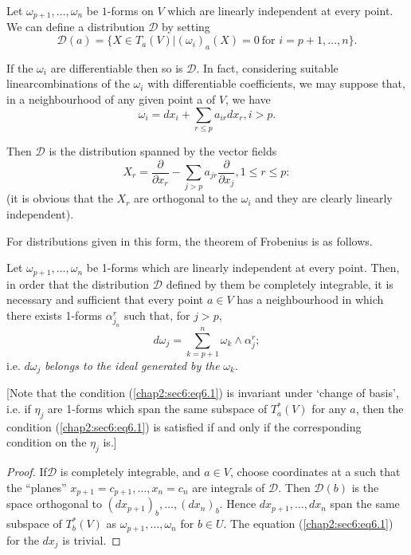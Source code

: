 Let $\omega_{p+1}, \ldots, \omega_n$ be $1$-forms on $V$ which are
linearly independent at every point. We can define a distribution
$\mathscr{D}$ by setting 
$$
\mathscr{D}(a) = \{ X \in T_a (V) \bigg| (\omega_i)_a (X) = 0 ~\text{
  for }i = p + 1, \ldots, n \}. 
$$

If the $\omega_i$ are differentiable then so is $\mathscr{D}$. In
fact, considering suitable linear\pageoriginale combinations of the $\omega_i$ with
differentiable coefficients, we may suppose that, in a neighbourhood
of any given point a of $V$, we have 
$$
\omega_i = dx_i + \sum_{r \leq p}a_{ir} dx_r, i > p.
$$

Then $\mathscr{D}$ is the distribution spanned by the vector fields 
$$
X_r = \frac{\partial}{\partial x_r}- \sum_{j > p} a_{jr}
\frac{\partial}{\partial x_j}, 1 \leq r \leq p: 
$$
(it is obvious that the $X_r$ are orthogonal to the $\omega_i$ and
they are clearly linearly independent).   

For distributions given in this form, the theorem of Frobenius is as follows.

\begin{theorem}\label{chap2:sec6:thm2} %
  Let $ \omega_{p+1}, \ldots , \omega_n$ be 1-forms which are linearly
  independent at every point. Then, in order that the distribution
  $\mathscr{D}$ defined by them be completely integrable, it is
  necessary and sufficient that every point $a \in V$ has a
  neighbourhood in which there exists 1-forms $\alpha^r_{j_n}$ such
  that, for $j > p$, 
  \begin{equation*}
    d \omega_j = \sum^n_{k=p+1} \omega_k \wedge \alpha^r_j;
    \tag{6.1}\label{chap2:sec6:eq6.1} 
  \end{equation*}
  i.e. $d \omega_j$ {\em belongs to the ideal generated by the} $\omega_k$.
\end{theorem}

[Note that the condition (\ref{chap2:sec6:eq6.1}) is invariant under
  `change of basis', 
  i.e. if $\eta_j$ are 1-forms which span the same subspace of
  $T^*_a (V)$ for any $a$, then the condition (\ref{chap2:sec6:eq6.1})
  is satisfied if 
  and only if the corresponding condition on the $\eta_j$ is.]
 
\begin{proof}
  If\pageoriginale $\mathscr{D}$ is completely integrable, and $a \in V$, choose
  coordinates at a such that the ``planes'' $x_{p+1} = c_{p+1}, \ldots,
  x_n = c_n$ are integrals of $\mathscr{D}$. Then $\mathscr{D}(b)$ is
  the space orthogonal to $(dx_{p+1})_b, \ldots, (dx_n)_b$. Hence
  $dx_{p+1}, \ldots, dx_n$ span the same subspace of $T^*_b(V)$ as
  $\omega_{p+1}, \ldots, \omega_n$ for $b \in U$. The equation
  (\ref{chap2:sec6:eq6.1})
  for the $dx_j$ is trivial. 
\end{proof}

